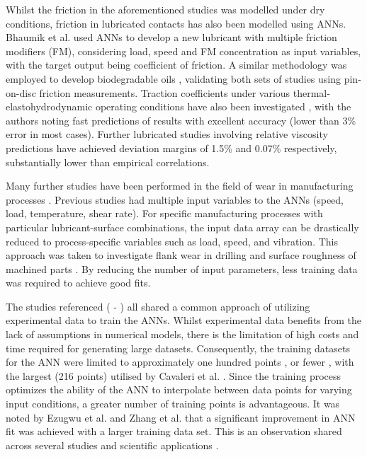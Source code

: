 Whilst the friction in the aforementioned studies was modelled under dry conditions, friction in lubricated contacts has also been modelled using ANNs. Bhaumik et al. \cite{Bhaumik2019a} used ANNs to develop a new lubricant with multiple friction modifiers (FM), considering load, speed and FM concentration as input variables, with the target output being coefficient of friction. A similar methodology was employed to develop biodegradable oils \cite{Bhaumik2019a}, validating both sets of studies using pin-on-disc friction measurements. Traction coefficients under various thermal-elastohydrodynamic operating conditions have also been investigated \cite{EchavarriOtero2014}, with the authors noting fast predictions of results with excellent accuracy (lower than 3\% error in most cases). Further lubricated studies involving relative viscosity predictions \cite{Afrand2016} \cite{HemmatEsfe2018} have achieved deviation margins of 1.5\% and 0.07\% respectively, substantially lower than empirical correlations.

Many further studies have been performed in the field of wear in manufacturing processes \cite{Ripa2004}. Previous studies had multiple input variables to the ANNs (speed, load, temperature, shear rate). For specific manufacturing processes with particular lubricant-surface combinations, the input data array can be drastically reduced to process-specific variables such as load, speed, and vibration. This approach was taken to investigate flank wear in drilling \cite{Panda2008} and surface roughness of machined parts \cite{Asilturk2011}. By reducing the number of input parameters, less training data was required to achieve good fits.

The studies referenced (\cite{Ezugwu1995} - \cite{Asilturk2011}) all shared a common approach of utilizing experimental data to train the ANNs. Whilst experimental data benefits from the lack of assumptions in numerical models, there is the limitation of high costs and time required for generating large datasets. Consequently, the training datasets for the ANN were limited to approximately one hundred points \cite{Zhang2002} \cite{Hayajneh2009}, or fewer \cite{Ezugwu1995} \cite{Rutherford1996}, with the largest (216 points) utilised by Cavaleri et al. \cite{Cavaleri2019}. Since the training process optimizes the ability of the ANN to interpolate between data points for varying input conditions, a greater number of training points is advantageous. It was noted by Ezugwu et al. \cite{Ezugwu1995} and Zhang et al. \cite{Zhang2002} that a significant improvement in ANN fit was achieved with a larger training data set. This is an observation shared across several studies and scientific applications \cite{Barbedo2018}.

